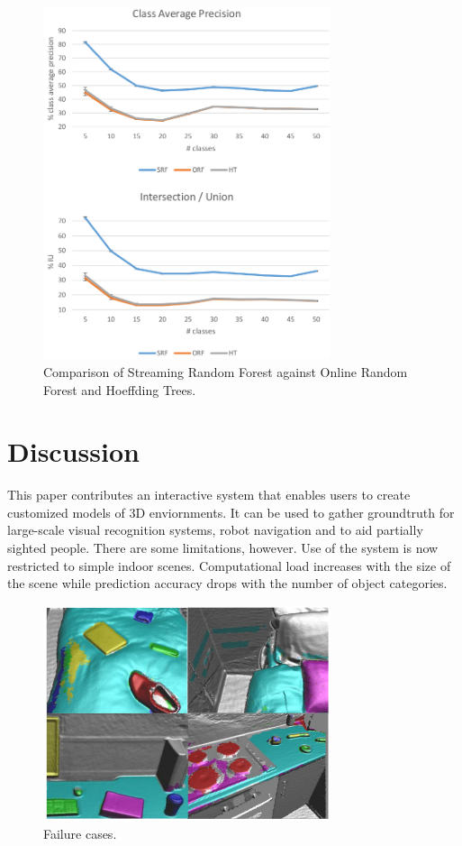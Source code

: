 \documentclass{llncs}
\begin{document}
\begin{figure}[!ht]
 \center
 \includegraphics[width=0.75\textwidth]{figures/srf_results}
 \caption{Comparison of Streaming Random Forest against Online Random Forest and Hoeffding Trees.}
 \label{fig:srf_results}
\end{figure}

\section{Discussion}

  This paper contributes an interactive system that enables users to create customized models of 3D enviornments. It can be used to gather groundtruth for large-scale visual recognition systems, robot navigation and to aid partially sighted people. There are some limitations, however. Use of the system is now restricted to simple indoor scenes. Computational load increases with the size of the scene while prediction accuracy drops with the number of object categories.
  
\begin{figure}[!ht]	 
 \center
 \includegraphics[width=0.75\textwidth]{figures/failures}
 \caption{Failure cases.}
 \label{fig:failures}
\end{figure}
  
\end{document}
